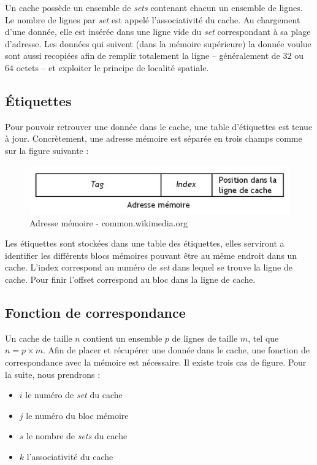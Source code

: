 Un cache possède un ensemble de \textit{sets} contenant chacun un ensemble de lignes. Le nombre de lignes par \textit{set} est appelé l'associativité du cache. Au chargement d'une donnée, elle est insérée dans une ligne vide du \textit{set} correspondant à sa plage d'adresse. Les données qui suivent (dans la mémoire supérieure) la donnée voulue sont aussi recopiées afin de remplir totalement la ligne -- généralement de $32$ ou $64$ octets -- et exploiter le principe de localité spatiale.

\subsection{\'Etiquettes}
Pour pouvoir retrouver une donnée dans le cache, une table d'étiquettes est tenue à jour. Concrètement, une adresse mémoire est séparée en trois champs comme sur la figure suivante : \\

\begin{figure}[!h]
\begin{center}
   \includegraphics[scale=0.50]{images/etiquette.jpeg}
   \caption{\label{img:etiquette} Adresse mémoire - common.wikimedia.org}
\end{center}
\end{figure}

Les étiquettes sont stockées dans une table des étiquettes, elles serviront a identifier les différents blocs mémoires pouvant être au même endroit dans un cache. L'index correspond au numéro de \textit{set} dans lequel se trouve la ligne de cache. Pour finir l'offset correspond au bloc dans la ligne de cache.

\subsection{Fonction de correspondance}
Un cache de taille $n$ contient un ensemble $p$ de lignes de taille $m$, tel que $n = p \times m$. Afin de placer et récupérer une donnée dans le cache, une fonction de correspondance avec la mémoire est nécessaire. Il existe trois cas de figure. Pour la suite, nous prendrons : \\
\begin{itemize}
\item $i$ le numéro de \textit{set} du cache
\item $j$ le numéro du bloc mémoire
\item $s$ le nombre de \textit{sets} du cache
\item $k$ l'associativité du cache 
\end{itemize}

